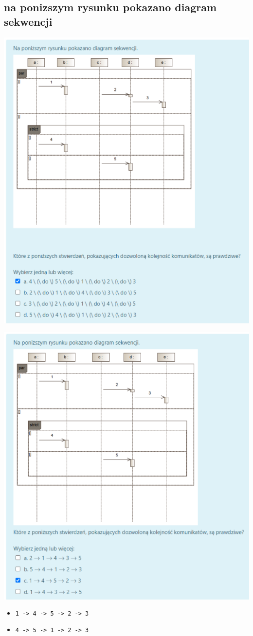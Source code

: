 \documentclass[11pt]{article}
\begin{document}
\subsection{na ponizszym rysunku pokazano diagram sekwencji}
\label{sec:orge140988}
\begin{center}
\includegraphics[width=.9\linewidth]{./zadanie3.png}
\end{center}
\begin{center}
\includegraphics[width=.9\linewidth]{./zadanie12.png}
\end{center}
\begin{itemize}
\item \texttt{1 -> 4 -> 5 -> 2 -> 3}
\item \texttt{4 -> 5 -> 1 -> 2 -> 3}
\end{itemize}
\end{document}

